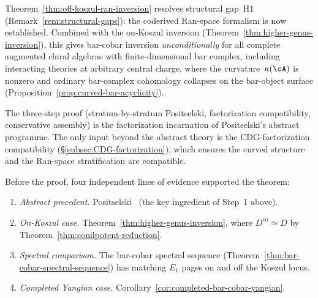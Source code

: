 \begin{remark}
\label{rem:H1-closure}
Theorem~\ref{thm:off-koszul-ran-inversion} resolves
structural gap~H1 (Remark~\ref{rem:structural-gaps}):
the coderived Ran-space formalism is now established.
Combined with the on-Koszul inversion
(Theorem~\ref{thm:higher-genus-inversion}), this gives
bar-cobar inversion \emph{unconditionally} for all complete
augmented chiral algebras with finite-dimensional bar
complex, including interacting theories at arbitrary
central charge, where the curvature~$\kappa(\cA)$ is nonzero
and ordinary bar-complex cohomology collapses on the bar-object
surface
\textup{(}Proposition~\ref{prop:curved-bar-acyclicity}\textup{)}.

The three-step proof (stratum-by-stratum Positselski,
factorization compatibility, conservative assembly) is the
factorization incarnation of Positselski's abstract
programme.  The only input beyond the abstract theory is
the CDG-factorization compatibility
(\S\ref{subsec:CDG-factorization}), which ensures the
curved structure and the Ran-space stratification are
compatible.
\end{remark}

\begin{remark}
\label{rem:off-koszul-evidence}
Before the proof, four independent lines of evidence
supported the theorem:
\begin{enumerate}[label=\textup{(\roman*)}]
\item \emph{Abstract precedent.}
  Positselski~\cite[Theorem~7.2]{Positselski11} (the key
  ingredient of Step~1 above).
\item \emph{On-Koszul case.}
  Theorem~\ref{thm:higher-genus-inversion}, where
  $D^{\mathrm{co}} \simeq D$ by
  Theorem~\ref{thm:conilpotent-reduction}.
\item \emph{Spectral comparison.}
  The bar-cobar spectral sequence
  (Theorem~\ref{thm:bar-cobar-spectral-sequence}) has matching
  $E_1$ pages on and off the Koszul locus.
\item \emph{Completed Yangian case.}
  Corollary~\ref{cor:completed-bar-cobar-yangian}.
\end{enumerate}
\end{remark}

